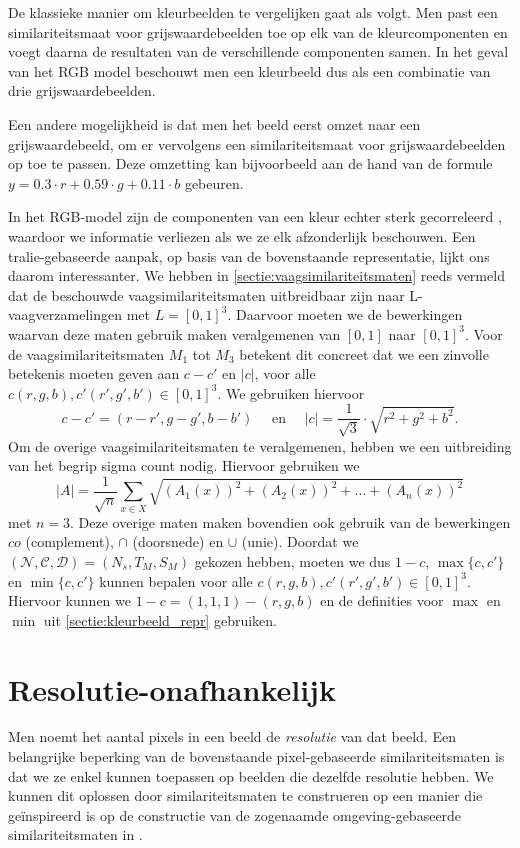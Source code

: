 De klassieke manier om kleurbeelden te vergelijken gaat als volgt. Men past een similariteitsmaat 
voor grijswaardebeelden toe op elk van de kleurcomponenten en voegt daarna de resultaten van de
verschillende componenten samen. In het geval van het RGB model beschouwt men een
kleurbeeld dus als een combinatie van drie grijswaardebeelden. 

Een andere mogelijkheid is dat men het beeld eerst omzet naar een grijswaardebeeld, om er 
vervolgens een similariteitsmaat voor grijswaardebeelden op toe te passen. Deze omzetting kan 
bijvoorbeeld aan de hand van de formule $y = 0.3 \cdot r + 0.59 \cdot g + 0.11 \cdot b$ gebeuren.

In het RGB-model zijn de componenten van een kleur echter sterk gecorreleerd 
\cite{sharma:digital_color_imaging}, waardoor we 
informatie verliezen als we ze elk afzonderlijk beschouwen. Een tralie-gebaseerde aanpak,
op basis van de bovenstaande representatie, lijkt ons daarom interessanter.
We hebben in \ref{sectie:vaagsimilariteitsmaten} reeds vermeld dat de beschouwde 
vaagsimilariteitsmaten uitbreidbaar zijn naar L-vaag\-ver\-za\-me\-ling\-en met
$L=[0,1]^3$. Daarvoor moeten we de bewerkingen waarvan deze maten gebruik maken veralgemenen van 
$[0,1]$ naar $[0,1]^3$. 
Voor de vaagsimilariteitsmaten $M_1$ tot $M_3$ betekent dit concreet dat we een zinvolle betekenis 
moeten geven aan $c - c'$ en $|c|$, voor alle $c(r,g,b),c'(r',g',b') \in [0,1]^3$. We gebruiken
hiervoor 
$$
c - c' = (r-r',g-g',b-b') \quad \textrm{ en } \quad |c| = \frac{1}{\sqrt{3}} \cdot \sqrt{r^2 + g^2 + b^2}.
$$
Om de overige vaagsimilariteitsmaten te veralgemenen, hebben we een uitbreiding van het
begrip sigma count nodig. Hiervoor gebruiken we
$$
|A|=\frac{1}{\sqrt{n}}\sum_{x \in X}\sqrt{(A_1(x))^2+(A_2(x))^2+\ldots+(A_n(x))^2}
$$
met $n=3$. Deze overige maten maken bovendien ook gebruik van de bewerkingen $co$ (complement), 
$\cap$ (doorsnede) en $\cup$ (unie). Doordat we 
$(\mathcal{N},\mathcal{C},\mathcal{D})=(N_s,T_M,S_M)$ gekozen hebben, moeten we
dus $1 - c$, $\max \{c,c'\}$ en $\min \{c,c'\}$ kunnen bepalen voor alle 
$c(r,g,b),c'(r',g',b') \in [0,1]^3$. Hiervoor kunnen we $1 - c = (1,1,1) - (r,g,b)$ en de
definities voor $\max$ en $\min$ uit \ref{sectie:kleurbeeld_repr} gebruiken.


\section{Resolutie-onafhankelijk}
\label{sectie:res-onafh}

Men noemt het aantal pixels in een beeld de \emph{resolutie} van dat beeld.
Een belangrijke beperking van de bovenstaande pixel-gebaseerde similariteitsmaten is dat we
ze enkel kunnen toepassen op beelden die dezelfde resolutie hebben. We kunnen dit oplossen
door similariteitsmaten te construeren op een manier die ge\"inspireerd is op de constructie
van de zogenaamde omgeving-gebaseerde similariteitsmaten in \cite{vanderweken:similariteitsmaten}. 

